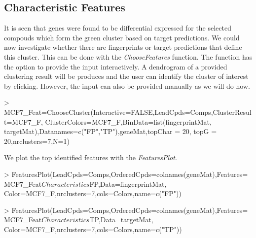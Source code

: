 \documentclass[a4paper]{article}
\begin{document}
\subsection{Characteristic Features}
It is seen that genes were found to be differential expressed for the selected
compouds which form the green cluster based on target predictions. We could now
investigate whether there are fingerprints or target predictions that define
this cluster. This can be done with the {\it ChooseFeatures} function. The
function has the option to provide the input interactively. A dendrogram of a
provided clustering result will be produces and the user can identify the
cluster of interest by clicking. However, the input can also be provided
manually as we will do now.
\begin{Schunk}
\begin{Sinput}
> MCF7_Feat=ChooseCluster(Interactive=FALSE,LeadCpds=Comps,ClusterResult=MCF7_F,
                         ClusterColors=MCF7_F,BinData=list(fingerprintMat,
                         targetMat),Datanames=c("FP","TP"),geneMat,topChar = 20,
                         topG = 20,nrclusters=7,N=1)
\end{Sinput}
\end{Schunk}
\noindent We plot the top identified features with the {\it FeaturesPlot}.
\begin{Schunk}
\begin{Sinput}
> FeaturesPlot(LeadCpds=Comps,OrderedCpds=colnames(geneMat),Features=
              MCF7_Feat$Characteristics$FP,Data=fingerprintMat,
              Color=MCF7_F,nrclusters=7,cols=Colors,name=c("FP"))
\end{Sinput}
\end{Schunk}
\begin{Schunk}
\begin{Sinput}
> FeaturesPlot(LeadCpds=Comps,OrderedCpds=colnames(geneMat),Features=
              MCF7_Feat$Characteristics$TP,Data=targetMat,
              Color=MCF7_F,nrclusters=7,cols=Colors,name=c("TP"))
\end{Sinput}
\end{Schunk}
\end{document}
